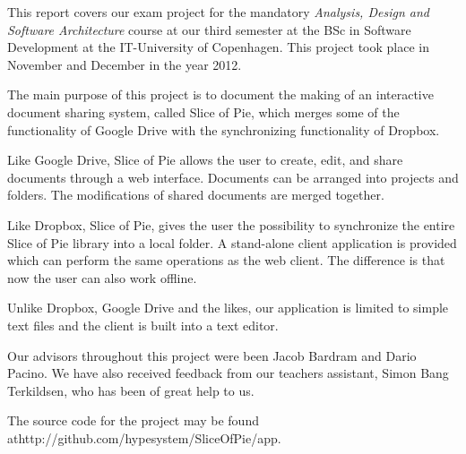 This report covers our exam project for the mandatory \emph{Analysis, Design and Software Architecture} course at our third semester at the BSc in Software Development at the IT-University of Copenhagen. This project took place in November and December in the year 2012. 

The main purpose of this project is to document the making of an interactive document sharing system, called Slice of Pie, which merges some of the functionality of Google Drive with the synchronizing functionality of Dropbox.
 
Like Google Drive, Slice of Pie allows the user to create, edit, and share documents through a web interface. Documents can be arranged into projects and folders. The modifications of shared documents are merged together.

Like Dropbox, Slice of Pie, gives the user the possibility to synchronize the entire Slice of Pie library into a local folder. A stand-alone client application is provided which can perform the same operations as the web client. The difference is that now the user can also work offline.

Unlike Dropbox, Google Drive and the likes, our application is limited to simple text files and the client is built into a text editor.

Our advisors throughout this project were been Jacob Bardram and Dario Pacino.
We have also received feedback from our teachers assistant, Simon Bang Terkildsen, who has been of great help to us.

The source code for the project may be found at\newline http://github.com/hypesystem/SliceOfPie/app.
